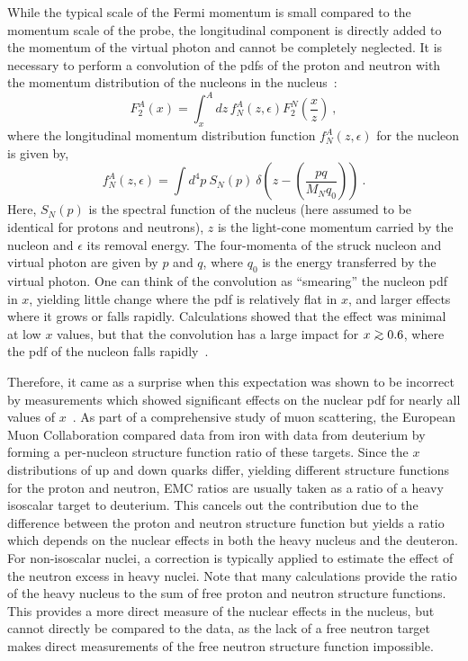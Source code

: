 While the typical scale of the Fermi momentum is small compared
to the momentum scale of the probe, the longitudinal component is directly
added to the momentum of the virtual photon and cannot be completely 
neglected. It is necessary to perform a convolution of the pdfs of the proton
and neutron with the momentum distribution of the nucleons in the
nucleus~\cite{Akulinichev:1985xq}:
%
\begin{equation}\label{conv_eqn}
F_2^A(x)=\int_{x}^A dz\, f_{N}^A(z,\epsilon) F_2^{N}\left(\frac{x}{z}\right) ~,
\end{equation}
%
where the longitudinal momentum distribution function $f_{N}^A(z,\epsilon)$
for the nucleon is given by,
%
\begin{equation}\label{conv2_eqn}
f_{N}^A(z,\epsilon)=
\int d^{4}p~S_N(p)~\delta\left(z-\left(\frac{pq}{M_N q_{0}}\right) \right) ~.
\end{equation}
%
Here, $S_N(p)$ is the spectral function of the nucleus (here assumed to be
identical for protons and neutrons), $z$ is the light-cone
momentum carried by the nucleon and $\epsilon$ its removal energy. The
four-momenta of the struck nucleon and virtual photon are given by $p$
and $q$, where $q_{0}$ is the energy transferred by the virtual photon. One
can think of the convolution as ``smearing'' the nucleon pdf in $x$, yielding
little change where the pdf is relatively flat in $x$, and larger effects
where it grows or falls rapidly. Calculations showed that the effect was
minimal at low $x$ values, but that the convolution has a large impact for $x
\gtorder 0.6$, where the pdf of the nucleon falls rapidly~\cite{bodek81a,
bodek81b, frankfurt81}.


Therefore, it came as a surprise when this expectation was shown to be
incorrect by measurements which showed significant effects on the nuclear
pdf for nearly all values of $x$~\cite{aubert83}. As part of a
comprehensive study of muon scattering, the European Muon Collaboration
compared data from iron with data from deuterium by forming a per-nucleon
structure function ratio of these targets. Since the $x$ distributions of up
and down quarks differ, yielding different structure functions for the
proton and neutron, EMC ratios are usually taken as a ratio of a heavy
isoscalar target to deuterium. This cancels out the contribution due to
the difference between the proton and neutron structure function but
yields a ratio which depends on the nuclear effects in both the heavy
nucleus and the deuteron. For non-isoscalar nuclei, a correction is typically
applied to estimate the effect of the neutron excess in heavy nuclei. Note
that many calculations provide the ratio of the heavy nucleus to the sum of
free proton and neutron structure functions. This provides a more direct
measure of the nuclear effects in the nucleus, but cannot directly be compared
to the data, as the lack of a free neutron target makes direct measurements of
the free neutron structure function impossible.


